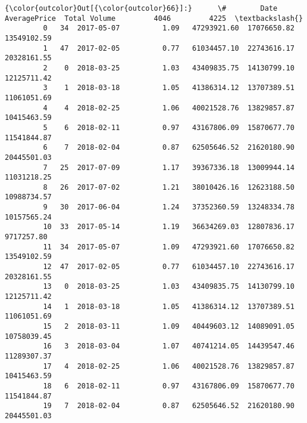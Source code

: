 \documentclass[11pt]{article}
\begin{document}
\begin{Verbatim}[commandchars=\\\{\}]
{\color{outcolor}Out[{\color{outcolor}66}]:}      \#        Date  AveragePrice  Total Volume         4046         4225  \textbackslash{}
         0   34  2017-05-07          1.09   47293921.60  17076650.82  13549102.59   
         1   47  2017-02-05          0.77   61034457.10  22743616.17  20328161.55   
         2    0  2018-03-25          1.03   43409835.75  14130799.10  12125711.42   
         3    1  2018-03-18          1.05   41386314.12  13707389.51  11061051.69   
         4    4  2018-02-25          1.06   40021528.76  13829857.87  10415463.59   
         5    6  2018-02-11          0.97   43167806.09  15870677.70  11541844.87   
         6    7  2018-02-04          0.87   62505646.52  21620180.90  20445501.03   
         7   25  2017-07-09          1.17   39367336.18  13009944.14  11031218.25   
         8   26  2017-07-02          1.21   38010426.16  12623188.50  10988734.57   
         9   30  2017-06-04          1.24   37352360.59  13248334.78  10157565.24   
         10  33  2017-05-14          1.19   36634269.03  12807836.17   9717257.80   
         11  34  2017-05-07          1.09   47293921.60  17076650.82  13549102.59   
         12  47  2017-02-05          0.77   61034457.10  22743616.17  20328161.55   
         13   0  2018-03-25          1.03   43409835.75  14130799.10  12125711.42   
         14   1  2018-03-18          1.05   41386314.12  13707389.51  11061051.69   
         15   2  2018-03-11          1.09   40449603.12  14089091.05  10758039.45   
         16   3  2018-03-04          1.07   40741214.05  14439547.46  11289307.37   
         17   4  2018-02-25          1.06   40021528.76  13829857.87  10415463.59   
         18   6  2018-02-11          0.97   43167806.09  15870677.70  11541844.87   
         19   7  2018-02-04          0.87   62505646.52  21620180.90  20445501.03   
         

\end{Verbatim}
\end{document}
